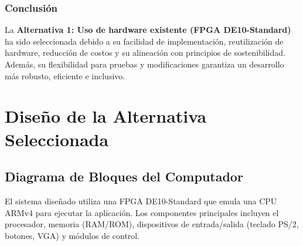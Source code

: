\documentclass[conference]{IEEEtran}
\begin{document}
\subsubsection*{Conclusión}

La \textbf{Alternativa 1: Uso de hardware existente (FPGA DE10-Standard)} ha sido seleccionada debido a su facilidad de implementación, reutilización de hardware, reducción de costos y su alineación con principios de sostenibilidad. Además, su flexibilidad para pruebas y modificaciones garantiza un desarrollo más robusto, eficiente e inclusivo.


\section{Diseño de la Alternativa Seleccionada}

\subsection*{Diagrama de Bloques del Computador}

El sistema diseñado utiliza una FPGA DE10-Standard que emula una CPU ARMv4 para ejecutar la aplicación. Los componentes principales incluyen el procesador, memoria (RAM/ROM), dispositivos de entrada/salida (teclado PS/2, botones, VGA) y módulos de control.
\end{document}
